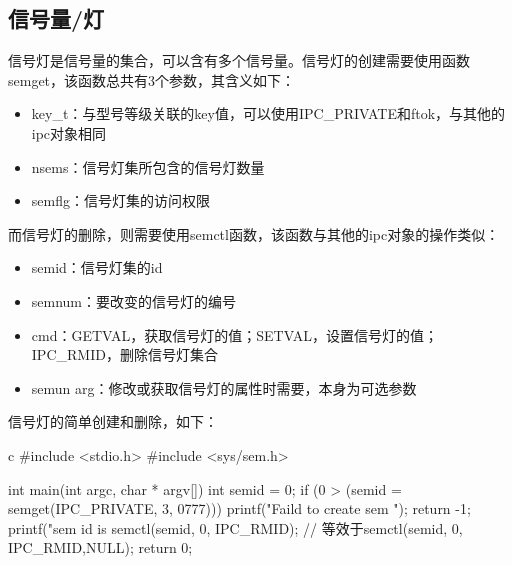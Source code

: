 \subsection{信号量/灯}
信号灯是信号量的集合，可以含有多个信号量。信号灯的创建需要使用函数semget，该函数总共有3个参数，其含义如下：
\begin{itemize}
  \item key\_t：与型号等级关联的key值，可以使用IPC\_PRIVATE和ftok，与其他的ipc对象相同
  \item nsems：信号灯集所包含的信号灯数量
  \item semflg：信号灯集的访问权限
\end{itemize}
而信号灯的删除，则需要使用semctl函数，该函数与其他的ipc对象的操作类似：
\begin{itemize}
  \item semid：信号灯集的id
  \item semnum：要改变的信号灯的编号
  \item cmd：GETVAL，获取信号灯的值；SETVAL，设置信号灯的值；IPC\_RMID，删除信号灯集合
  \item semun arg：修改或获取信号灯的属性时需要，本身为可选参数
\end{itemize}
信号灯的简单创建和删除，如下：
\begin{code-block}{c}
#include <stdio.h>
#include <sys/sem.h>

int main(int argc, char * argv[])
{
        int semid = 0;
        if (0 > (semid = semget(IPC_PRIVATE, 3, 0777)))
        {
                printf("Faild to create sem \n");
                return -1;
        }
        printf("sem id is %
        semctl(semid, 0, IPC_RMID); // 等效于semctl(semid, 0, IPC_RMID,NULL);
        return 0;
}
\end{code-block}

